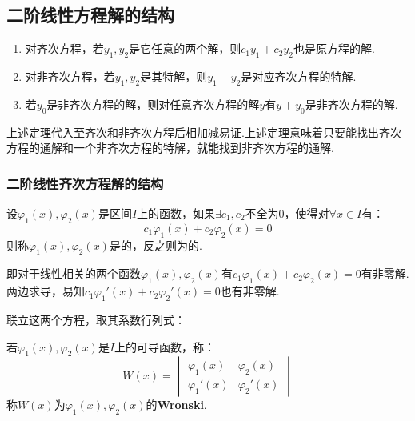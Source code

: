 \subsection{二阶线性方程解的结构}
\begin{theorem}
    \label{thm:SuperpositionPrincipleForLinearODEs}
    \begin{enumerate}[circ]
        \item 对齐次方程，若$y_1,y_2$是它任意的两个解，则$c_1 y_1 + c_2 y_2$也是原方程的解.
        \item 对非齐次方程，若$y_1,y_2$是其特解，则$y_1 - y_2$是对应齐次方程的特解.
        \item 若$y_0$是非齐次方程的解，则对任意齐次方程的解$y$有$y+y_0$是非齐次方程的解.
    \end{enumerate}
\end{theorem}

上述定理代入至齐次和非齐次方程后相加减易证.上述定理意味着只要能找出齐次方程的通解和一个非齐次方程的特解，就能找到非齐次方程的通解.

\subsubsection{二阶线性齐次方程解的结构}
\begin{definition}
    设$\varphi_1(x),\varphi_2(x)$是区间$I$上的函数，如果$\exists c_1,c_2$不全为$0$，使得对$\forall x \in I$有：
    \[c_1 \varphi_1(x) + c_2 \varphi_2(x) = 0\]
    则称$\varphi_1(x),\varphi_2(x)$是的，反之则为的. 
\end{definition}

即对于线性相关的两个函数$\varphi_1(x),\varphi_2(x)$有$c_1 \varphi_1(x) + c_2 \varphi_2(x) = 0$有非零解.两边求导，易知$c_1 \varphi_1'(x) + c_2 \varphi_2'(x) = 0$也有非零解.

联立这两个方程，取其系数行列式：

\begin{definition}
    若$\varphi_1(x),\varphi_2(x)$是$I$上的可导函数，称：
    \[W(x) = \begin{vmatrix}
        \varphi_1(x) & \varphi_2(x) \\
        \varphi_1'(x) & \varphi_2'(x)
    \end{vmatrix}\]
    称$W(x)$为$\varphi_1(x),\varphi_2(x)$的\textbf{Wronski}.
\end{definition}

